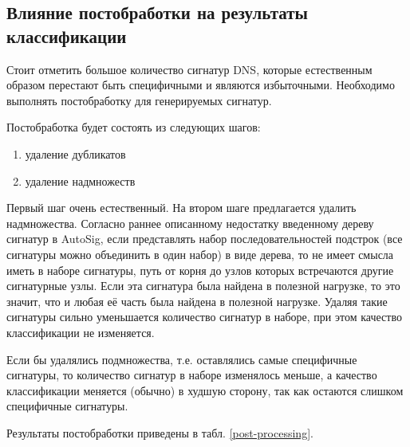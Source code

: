 \subsection{Влияние постобработки на результаты классификации}

Стоит отметить большое количество сигнатур DNS, которые естественным образом перестают быть специфичными и являются избыточными.
Необходимо выполнять постобработку для генерируемых сигнатур.

Постобработка будет состоять из следующих шагов:

\begin{enumerate}
    \item удаление дубликатов
    \item удаление надмножеств
\end{enumerate}

Первый шаг очень естественный. На втором шаге предлагается удалить надмножества.
Согласно раннее описанному недостатку введенному дереву сигнатур в AutoSig, если представлять набор последовательностей подстрок (все сигнатуры можно объединить в один набор)
в виде дерева, то не имеет смысла иметь в наборе сигнатуры, путь от корня до узлов которых встречаются другие сигнатурные узлы.
Если эта сигнатура была найдена в полезной нагрузке, то это значит, что и любая её часть была найдена в полезной нагрузке.
Удаляя такие сигнатуры сильно уменьшается количество сигнатур в наборе, при этом качество классификации не изменяется.

Если бы удалялись подмножества, т.е. оставлялись самые специфичные сигнатуры, то количество сигнатур в наборе изменялось меньше,
а качество классификации меняется (обычно) в худшую сторону, так как остаются слишком специфичные сигнатуры.


Результаты постобработки приведены в табл. \ref{post-processing}.

